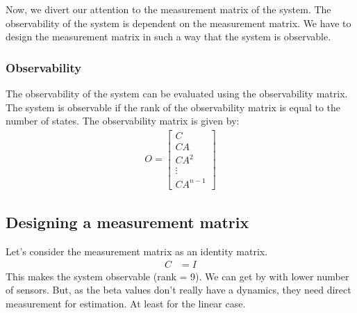 \documentclass[12pt]{article}
\begin{document}
\color{black}



Now, we divert our attention to the measurement matrix of the system. The observability of the system is dependent on the measurement matrix. We have to design the measurement matrix in such a way that the system is observable. 

\subsubsection*{Observability}
The observability of the system can be evaluated using the observability matrix. The system is observable if the rank of the observability matrix is equal to the number of states. The observability matrix is given by:
\begin{align*}
    O = \begin{bmatrix}
        C \\
        CA \\
        CA^2 \\
        \vdots \\
        CA^{n-1}
    \end{bmatrix}
\end{align*}

\subsection*{Designing a measurement matrix}
Let's consider the measurement matrix as an identity matrix. 
\begin{align*}
    C &= I
\end{align*}
This makes the system observable (rank = 9). We can get by with lower number of sensors. But, as the beta values don't really have a dynamics, they need direct measurement for estimation. At least for the linear case.
\end{document}
